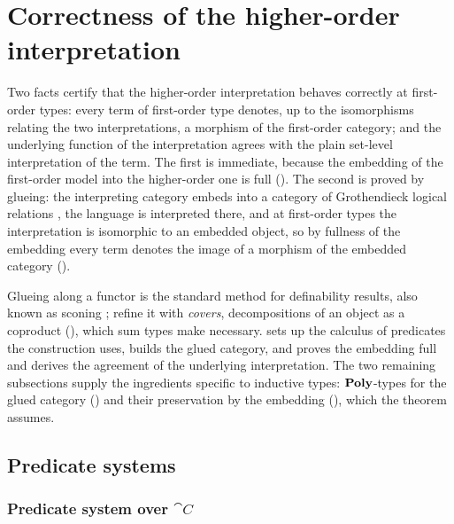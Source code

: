 \section{Correctness of the higher-order interpretation}
\label{sec:conservativity}

Two facts certify that the higher-order interpretation behaves correctly at first-order
types: every term of first-order type denotes, up to the isomorphisms relating the two
interpretations, a morphism of the first-order category; and the underlying function of the
interpretation agrees with the plain set-level interpretation of the term. The first is immediate,
because the embedding of the first-order model into the higher-order one is full
(). The second is
proved by glueing: the interpreting category embeds into a category of Grothendieck logical
relations \citep{fiore-simpson99}, the language is interpreted there, and at first-order types the
interpretation is isomorphic to an embedded object, so by fullness of the embedding every term
denotes the image of a morphism of the embedded category ().

Glueing along a functor is the standard method for definability results, also known as
sconing \citep{mitchell-scedrov92}; \citet{fiore-simpson99} refine it with \emph{covers},
decompositions of an object as a coproduct (), which sum types make
necessary.  sets up the calculus of predicates the construction uses,
 builds the glued category, and 
proves the embedding full and derives the agreement of the underlying
interpretation. The two remaining subsections
supply the ingredients specific to inductive types: $\mathbf{Poly}$-types for the glued category
() and their preservation by the embedding
(), which the theorem assumes.

\subsection{Predicate systems}
\label{sec:predicate-system}

\subsubsection{Predicate system over $\cat{C}$}


